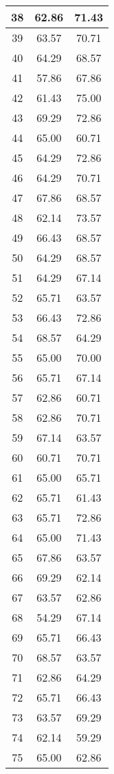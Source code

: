 \documentclass[11pt]{article}
\begin{document}
\begin{longtable}[c]{| c | c |c |}
38 & 62.86 & 71.43 \\ \hline
39 & 63.57 & 70.71 \\ \hline
40 & 64.29 & 68.57 \\ \hline
41 & 57.86 & 67.86 \\ \hline
42 & 61.43 & 75.00 \\ \hline
43 & 69.29 & 72.86 \\ \hline
44 & 65.00 & 60.71 \\ \hline
45 & 64.29 & 72.86 \\ \hline
46 & 64.29 & 70.71 \\ \hline
47 & 67.86 & 68.57 \\ \hline
48 & 62.14 & 73.57 \\ \hline
49 & 66.43 & 68.57 \\ \hline
50 & 64.29 & 68.57 \\ \hline
51 & 64.29 & 67.14 \\ \hline
52 & 65.71 & 63.57 \\ \hline
53 & 66.43 & 72.86 \\ \hline
54 & 68.57 & 64.29 \\ \hline
55 & 65.00 & 70.00 \\ \hline
56 & 65.71 & 67.14 \\ \hline
57 & 62.86 & 60.71 \\ \hline
58 & 62.86 & 70.71 \\ \hline
59 & 67.14 & 63.57 \\ \hline
60 & 60.71 & 70.71 \\ \hline
61 & 65.00 & 65.71 \\ \hline
62 & 65.71 & 61.43 \\ \hline
63 & 65.71 & 72.86 \\ \hline
64 & 65.00 & 71.43 \\ \hline
65 & 67.86 & 63.57 \\ \hline
66 & 69.29 & 62.14 \\ \hline
67 & 63.57 & 62.86 \\ \hline
68 & 54.29 & 67.14 \\ \hline
69 & 65.71 & 66.43 \\ \hline
70 & 68.57 & 63.57 \\ \hline
71 & 62.86 & 64.29 \\ \hline
72 & 65.71 & 66.43 \\ \hline
73 & 63.57 & 69.29 \\ \hline
74 & 62.14 & 59.29 \\ \hline
75 & 65.00 & 62.86 \\ \hline

\end{longtable}
\end{document}
